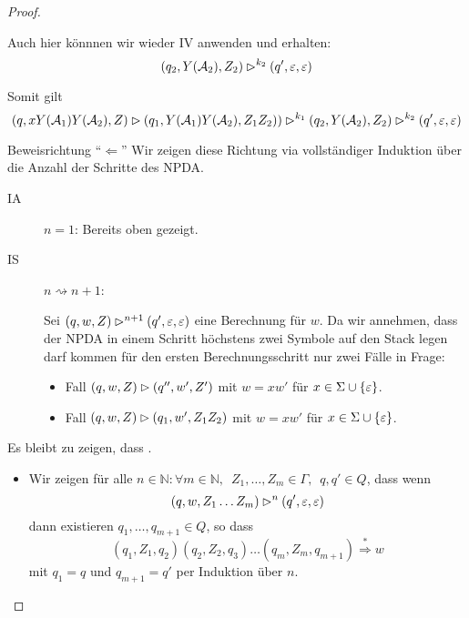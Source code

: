 \begin{proof}
\begin{itemize}
\begin{description}
\begin{itemize}
      
      Auch hier könnnen wir wieder IV anwenden und erhalten:
          \begin{displaymath}
            (q_2, Y(\mathcal{A}_2), Z_2) \rhd^{k_2} (q', \varepsilon, \varepsilon)
          \end{displaymath}
          
                    Somit gilt
          \begin{displaymath}
            (q, xY(\mathcal{A}_1)Y(\mathcal{A}_2), Z) \rhd (q_1, Y(\mathcal{A}_1)Y(\mathcal{A}_2), Z_1Z_2)) \rhd^{k_1} (q_2, Y(\mathcal{A}_2), Z_2) \rhd^{k_2} (q', \varepsilon, \varepsilon)
          \end{displaymath}
      \end{itemize}
      
     \end{description}

    \end{itemize}
    
    \item Beweisrichtung ``$\Leftarrow$''
     Wir zeigen diese Richtung via vollständiger Induktion über die Anzahl der Schritte des \ac{NPDA}.
     \begin{description}
      \item[IA] $n=1$: Bereits oben gezeigt.
      \item[IS] $n\rightsquigarrow n+1$:
      
      Sei $(q,w,Z) \rhd^{n+1} (q',\varepsilon,\varepsilon)$ eine Berechnung für $w$. Da wir annehmen, 
      dass der \ac{NPDA} in einem Schritt höchstens zwei Symbole auf den Stack legen darf kommen für den ersten Berechnungsschritt nur zwei Fälle in Frage:
      \begin{itemize}
      \item Fall $(q,w,Z)\rhd (q'', w',Z')$ mit $w=xw'$ für $x\in\Sigma\cup\{\varepsilon\}$.
      \item Fall $(q,w,Z)\rhd (q_1, w',Z_1Z_2)$ mit $w=xw'$ für $x\in\Sigma\cup\{\varepsilon\}$.
      \end{itemize}
     \end{description}
     

    \color{red}
    

    Es bleibt zu zeigen, dass .
    \begin{itemize}

    \item Wir zeigen für alle $n \in \mathbb{N}: \forall m \in \mathbb{N},\enspace Z_1,\ldots,Z_m \in \Gamma,\enspace q,q' \in Q$, dass wenn
      \begin{displaymath}
        (q,w,Z_1\ldots Z_m) \rhd^n (q', \varepsilon, \varepsilon)
      \end{displaymath}
      dann existieren $q_1,\ldots,q_{m+1} \in Q$, so dass
      \begin{displaymath}
        (q_1,Z_1,q_2)(q_2,Z_2,q_3)\ldots(q_m,Z_m,q_{m+1}) \stackrel{*}{\Longrightarrow} w
      \end{displaymath}
      mit $q_1 = q$ und $q_{m+1} = q'$ per Induktion über $n$.


\end{itemize}
\end{proof}
